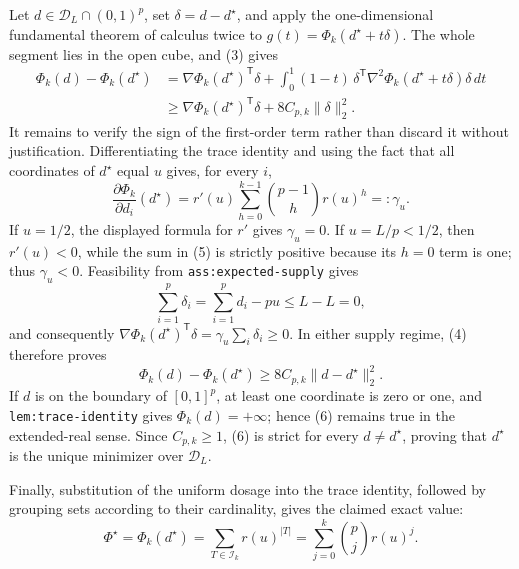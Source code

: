 Let \(d\in\mathcal D_L\cap(0,1)^p\), set \(\delta=d-d^\star\), and apply the one-dimensional fundamental theorem of calculus twice to \(g(t)=\Phi_k(d^\star+t\delta)\).  The whole segment lies in the open cube, and (3) gives
\[
\begin{aligned}
 \Phi_k(d)-\Phi_k(d^\star)
 &=\nabla\Phi_k(d^\star)^{\mathsf T}\delta
   +\int_0^1(1-t)\,\delta^{\mathsf T}
       \nabla^2\Phi_k(d^\star+t\delta)\delta\,dt\\
 &\ge \nabla\Phi_k(d^\star)^{\mathsf T}\delta
   +8C_{p,k}\|\delta\|_2^2. \tag{4}
\end{aligned}
\]
It remains to verify the sign of the first-order term rather than discard it without justification.  Differentiating the trace identity and using the fact that all coordinates of \(d^\star\) equal \(u\) gives, for every \(i\),
\[
 \frac{\partial\Phi_k}{\partial d_i}(d^\star)
 =r'(u)\sum_{h=0}^{k-1}\binom{p-1}{h}r(u)^h
 =:\gamma_u. \tag{5}
\]
If \(u=1/2\), the displayed formula for \(r'\) gives \(\gamma_u=0\).  If \(u=L/p<1/2\), then \(r'(u)<0\), while the sum in (5) is strictly positive because its \(h=0\) term is one; thus \(\gamma_u<0\).  Feasibility from \texttt{ass:expected-supply} gives
\[
 \sum_{i=1}^p\delta_i=\sum_{i=1}^p d_i-pu\le L-L=0,
\]
and consequently
\(\nabla\Phi_k(d^\star)^{\mathsf T}\delta
=\gamma_u\sum_i\delta_i\ge0\).  In either supply regime, (4) therefore proves
\[
 \Phi_k(d)-\Phi_k(d^\star)
 \ge8C_{p,k}\|d-d^\star\|_2^2. \tag{6}
\]
If \(d\) is on the boundary of \([0,1]^p\), at least one coordinate is zero or one, and \texttt{lem:trace-identity} gives \(\Phi_k(d)=+\infty\); hence (6) remains true in the extended-real sense.  Since \(C_{p,k}\ge1\), (6) is strict for every \(d\ne d^\star\), proving that \(d^\star\) is the unique minimizer over \(\mathcal D_L\).

Finally, substitution of the uniform dosage into the trace identity, followed by grouping sets according to their cardinality, gives the claimed exact value:
\[
 \Phi^\star=\Phi_k(d^\star)
 =\sum_{T\in\mathcal I_k}r(u)^{|T|}
 =\sum_{j=0}^k\binom pj r(u)^j. \tag{7}
\]

